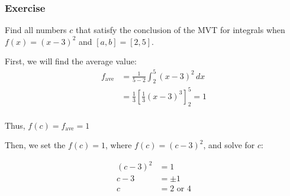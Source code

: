 \documentclass[t]{beamer}
\theoremstyle{plain}
\theoremstyle{definition}
\begin{document}
\begin{frame}

\frametitle{Exercise}

Find all numbers $c$ that satisfy the conclusion of the MVT for integrals when $f(x)=(x - 3)^2$ and $[a,b]=[2,5]$. \pause
\medskip

First, we will find the average value:
\begin{align*}
f_{\textrm{ave}} &= \frac{1}{5-2}\int_{2}^{5}(x-3)^2 \,dx\\
                             &= \frac{1}{3}\left[\frac{1}{3}(x - 3)^3\right]_{2}^{5} = 1\\
\end{align*}

\vspace{-1em}
Thus, $f(c) = f_{\textrm{ave}} = 1$

\medskip

Then,  we set the $f(c) = 1$, where $f(c) = (c - 3)^2$, and solve for $c$:

\vspace{-1em}
\begin{align*}
(c - 3)^2 &= 1\\
        c -3 &= \pm 1\\
        c &= 2 \text{ or } 4\\
\end{align*}

\end{frame}
\end{document}
